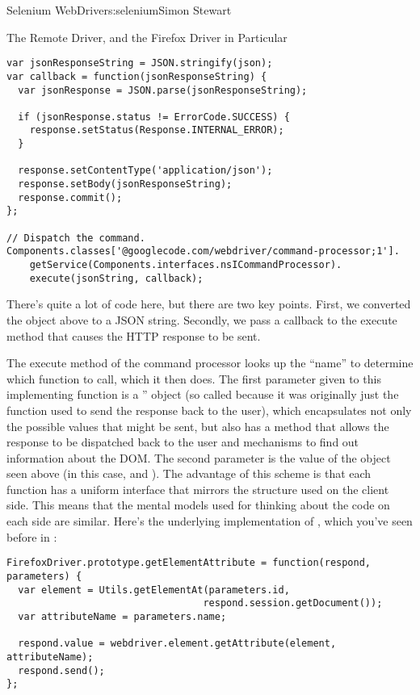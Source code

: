 \begin{aosachapter}{Selenium WebDriver}{s:selenium}{Simon Stewart}
\begin{aosasect1}{The Remote Driver, and the Firefox Driver in Particular}
\begin{verbatim}
var jsonResponseString = JSON.stringify(json);
var callback = function(jsonResponseString) {
  var jsonResponse = JSON.parse(jsonResponseString);

  if (jsonResponse.status != ErrorCode.SUCCESS) {
    response.setStatus(Response.INTERNAL_ERROR);
  }

  response.setContentType('application/json');
  response.setBody(jsonResponseString);
  response.commit();
};

// Dispatch the command.
Components.classes['@googlecode.com/webdriver/command-processor;1'].
    getService(Components.interfaces.nsICommandProcessor).
    execute(jsonString, callback);
\end{verbatim}

\pagebreak

There's quite a lot of code here, but there are two key points. First,
we converted the object above to a JSON string.  Secondly, we pass a
callback to the execute method that causes the HTTP response to be
sent.

The execute method of the command processor looks up the ``name'' to
determine which function to call, which it then does. The first
parameter given to this implementing function is a ''
object (so called because it was originally just the function used to
send the response back to the user), which encapsulates not only the
possible values that might be sent, but also has a method that allows
the response to be dispatched back to the user and mechanisms to find
out information about the DOM\@. The second parameter is the value of
the  object seen above (in this case,  and
). The advantage of this scheme is that each function has a
uniform interface that mirrors the structure used on the client
side. This means that the mental models used for thinking about the
code on each side are similar.  Here's the underlying implementation
of , which you've seen before in
:

\begin{verbatim}
FirefoxDriver.prototype.getElementAttribute = function(respond, parameters) {
  var element = Utils.getElementAt(parameters.id,
                                  respond.session.getDocument());
  var attributeName = parameters.name;

  respond.value = webdriver.element.getAttribute(element, attributeName);
  respond.send();
};
\end{verbatim}


\end{aosasect1}
\end{aosachapter}
